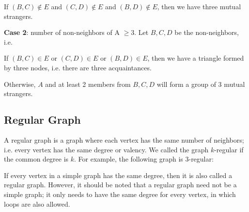 \begin{eg}
  If \((B, C) \notin E\) and \((C, D) \notin E\) and \((B, D) \notin E\), then we have three mutual strangers. 

  \textbf{Case 2}: number of non-neighbors of A \(\geq 3\). Let \(B, C, D\) be the non-neighbors, i.e. 
  \begin{figure}[H]
    \centering
  \end{figure}

  If \((B, C) \in E\) or \((C, D) \in E\) or \((B, D) \in E\), then we have a triangle formed by three nodes, i.e. there are three acquaintances. 

  Otherwise, \(A\) and at least 2 members from \(B, C, D\) will form a group of 3 mutual strangers.
\end{eg}

\subsection{Regular Graph}
A regular graph is a graph where each vertex has the same number of neighbors; i.e. every vertex has the same degree or valency. We called the graph \(k\)-regular if the common degree is \(k\).
For example, the following graph is 3-regular:
\begin{figure}[H]
  \centering
\end{figure}
If every vertex in a simple graph has the same degree, then it is also called a regular graph. However, it should be noted that a regular graph need not be a simple graph; it only needs to have the same degree for every vertex, in which loops are also allowed.

